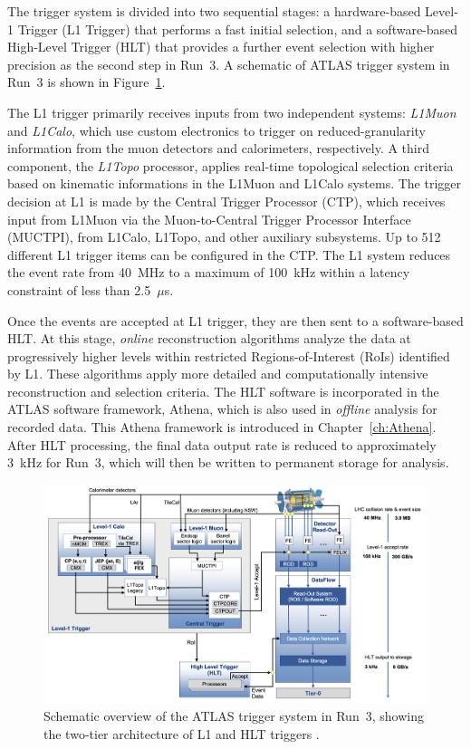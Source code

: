 The trigger system is divided into two sequential stages: a hardware-based Level-1 Trigger (L1 Trigger) that performs a fast initial selection, and a software-based High-Level Trigger (HLT) that provides a further event selection with higher precision as the second step in Run~3. A schematic of ATLAS trigger system in Run~3 is shown in Figure~\ref{fig:trigger_run3}.

The L1 trigger primarily receives inputs from two independent systems: \textit{L1Muon} and \textit{L1Calo}, which use custom electronics to trigger on reduced-granularity information from the muon detectors and calorimeters, respectively. A third component, the \textit{L1Topo} processor, applies real-time topological selection criteria based on kinematic informations in the L1Muon and L1Calo systems. The trigger decision at L1 is made by the Central Trigger Processor (CTP), which receives input from L1Muon via the Muon-to-Central Trigger Processor Interface (MUCTPI), from L1Calo, L1Topo, and other auxiliary subsystems. Up to 512 different L1 trigger items can be configured in the CTP. The L1 system reduces the event rate from 40~MHz to a maximum of 100~kHz within a latency constraint of less than 2.5~$\mu$s. 

Once the events are accepted at L1 trigger, they are then sent to a software-based HLT. At this stage, \textit{online} reconstruction algorithms analyze the data at progressively higher levels within restricted Regions-of-Interest (RoIs) identified by L1. These algorithms apply more detailed and computationally intensive reconstruction and selection criteria. The HLT software is incorporated in the ATLAS software framework, Athena, which is also used in \textit{offline} analysis for recorded data. This Athena framework is introduced in Chapter~\ref{ch:Athena}. After HLT processing, the final data output rate is reduced to approximately 3~kHz for Run~3, which will then be written to permanent storage for analysis.

\begin{figure}[htbp]
  \centering
  \includegraphics[width=1.0\textwidth]{figs/chapter2/trigger_run3_1.png}
  \caption{Schematic overview of the ATLAS trigger system in Run~3, showing the two-tier architecture of L1 and HLT triggers \cite{ATLASRun3Trigger}.}
  \label{fig:trigger_run3}
\end{figure}

